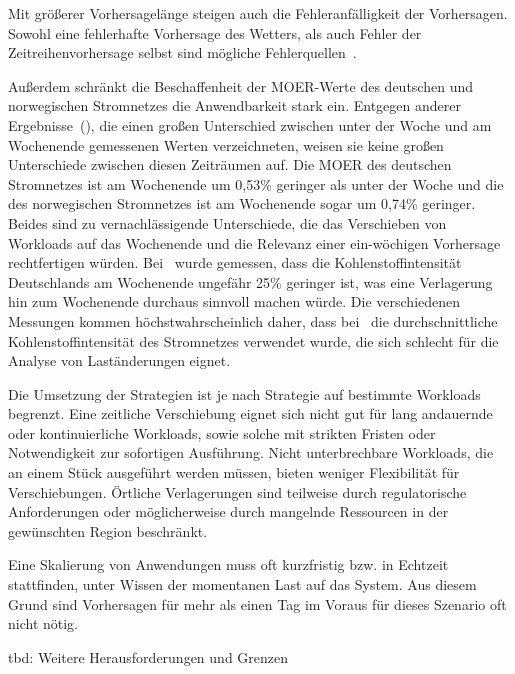 Mit größerer Vorhersagelänge steigen auch die Fehleranfälligkeit der Vorhersagen.
Sowohl eine fehlerhafte Vorhersage des Wetters, als auch Fehler der Zeitreihenvorhersage selbst sind mögliche Fehlerquellen~\cite{Wiesner.2021}.

Außerdem schränkt die Beschaffenheit der \ac{MOER}-Werte des deutschen und norwegischen Stromnetzes die Anwendbarkeit stark ein.
Entgegen anderer Ergebnisse~(\cite{Wiesner.2021}), die einen großen Unterschied zwischen unter der Woche und am Wochenende gemessenen Werten verzeichneten, weisen sie keine großen Unterschiede zwischen diesen Zeiträumen auf.
Die \ac{MOER} des deutschen Stromnetzes ist am Wochenende um 0,53\% geringer als unter der Woche und die des norwegischen Stromnetzes ist am Wochenende sogar um 0,74\% geringer.
Beides sind zu vernachlässigende Unterschiede, die das Verschieben von Workloads auf das Wochenende und die Relevanz einer ein-wöchigen Vorhersage rechtfertigen würden.
Bei~\cite{Wiesner.2021} wurde gemessen, dass die Kohlenstoffintensität Deutschlands am Wochenende ungefähr 25\% geringer ist, was eine Verlagerung hin zum Wochenende durchaus sinnvoll machen würde.
Die verschiedenen Messungen kommen höchstwahrscheinlich daher, dass bei~\cite{Wiesner.2021} die durchschnittliche Kohlenstoffintensität des Stromnetzes verwendet wurde, die sich schlecht für die Analyse von Laständerungen eignet.

Die Umsetzung der Strategien ist je nach Strategie auf bestimmte Workloads begrenzt.
Eine zeitliche Verschiebung eignet sich nicht gut für lang andauernde oder kontinuierliche Workloads, sowie solche mit strikten Fristen oder Notwendigkeit zur sofortigen Ausführung.
Nicht unterbrechbare Workloads, die an einem Stück ausgeführt werden müssen, bieten weniger Flexibilität für Verschiebungen.
Örtliche Verlagerungen sind teilweise durch regulatorische Anforderungen oder möglicherweise durch mangelnde Ressourcen in der gewünschten Region beschränkt.

Eine Skalierung von Anwendungen muss oft kurzfristig bzw. in Echtzeit stattfinden, unter Wissen der momentanen Last auf das System.
Aus diesem Grund sind Vorhersagen für mehr als einen Tag im Voraus für dieses Szenario oft nicht nötig.

tbd: Weitere Herausforderungen und Grenzen

